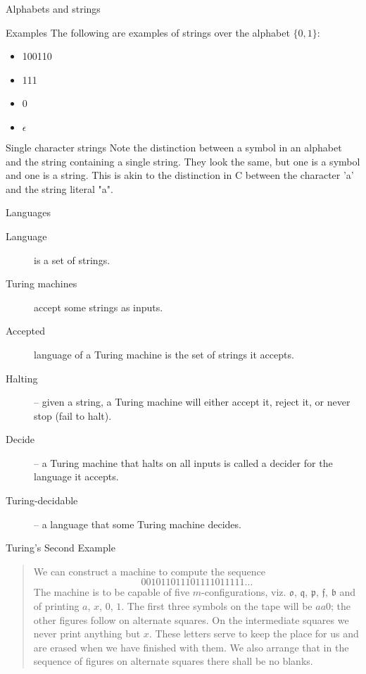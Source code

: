 \begin{frame}{Alphabets and strings}
  \begin{alertblock}{Examples}
    The following are examples of strings over the alphabet $\{0,1\}$:
    \begin{itemize}
      \item 100110
      \item 111
      \item 0
      \item $\epsilon$
    \end{itemize}
  \end{alertblock}
\begin{alertblock}{Single character strings}
Note the distinction between a symbol in an alphabet and the string containing a single string.
They look the same, but one is a symbol and one is a string. 
This is akin to the distinction in C between the character 'a' and the string literal "a".
\end{alertblock}
\end{frame}


\begin{frame}{Languages}

\begin{description}
  \item[Language] is a set of strings.
  \item[Turing machines] accept some strings as inputs.
  \item[Accepted] language of a Turing machine is the set of strings it accepts.
  \item[Halting] -- given a string, a Turing machine will either accept it, reject it, or never stop (fail to halt).
  \item[Decide] -- a Turing machine that halts on all inputs is called a decider for the language it accepts.
  \item[Turing-decidable] -- a language that some Turing machine decides.
\end{description}

\end{frame}



\begin{frame}{Turing's Second Example}
  \begin{quote}
    We can construct a machine to compute the sequence
    \[ 001011011101111011111 \ldots \]
    The machine is to be capable of five $m$-configurations, viz. $\mathfrak{o}$, $\mathfrak{q}$, $\mathfrak{p}$, $\mathfrak{f}$, $\mathfrak{b}$ and of printing $a$, $x$, $0$, $1$.
    The first three symbols on the tape will be $aa0$; the other figures follow on alternate squares.
    On the intermediate squares we never print anything but $x$.
    These letters serve to keep the place for us and are erased when we have finished with them.
    We also arrange that in the sequence of figures on alternate squares there shall be no blanks.
  \end{quote}
\end{frame}



